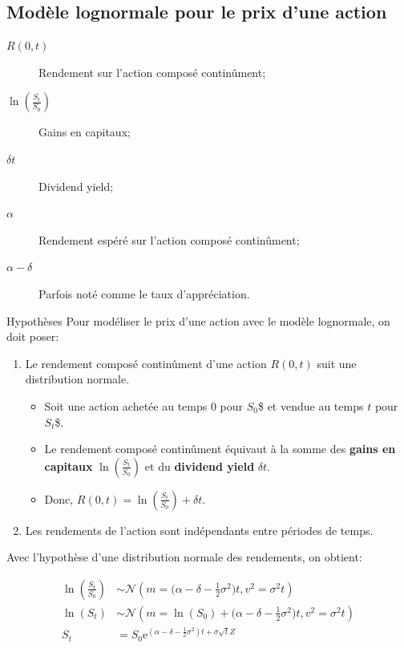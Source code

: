 \documentclass[10pt, french]{article}
\begin{document}
\begin{multicols*}{2}
\columnbreak

\subsection*{Modèle lognormale pour le prix d'une action}

\begin{distributions}[Notation]
\begin{description}
	\item[$R(0, t)$]	Rendement sur l'action composé continûment;
	\item[$\ln\left(\frac{S_{t}}{S_{0}}\right)$]	Gains en capitaux;
	\item[$\delta t$]	Dividend yield;
	\item[$\alpha$]	Rendement espéré sur l'action composé continûment;
	\item[$\alpha - \delta$]	Parfois noté comme le taux d'appréciation.
\end{description}
\end{distributions}

\begin{conceptgen}{Hypothèses}
Pour modéliser le prix d'une action avec le modèle lognormale, on doit poser:
\begin{enumerate}[leftmargin = *]
	\item	Le rendement composé continûment d'une action $R(0, t)$ suit une distribution normale.
			\begin{itemize}[leftmargin = *]
			\item	Soit une action achetée au temps $0$ pour $S_{0}$\$ et vendue au temps $t$ pour $S_{t}$\$.
			\item	Le rendement composé continûment équivaut à la somme des \textbf{gains en capitaux} $\ln\left(\frac{S_{t}}{S_{0}}\right)$ et du \textbf{dividend yield} $\delta t$.
			\item	Donc, $R(0, t) = \ln\left(\frac{S_{t}}{S_{0}}\right) + \delta t$.
			\end{itemize}
	\item	Les rendements de l'action sont indépendants entre périodes de temps.
\end{enumerate}
\end{conceptgen}

\begin{definitionNOHFILL}[Distribution]
Avec l'hypothèse d'une distribution normale des rendements, on obtient:

\begin{align*}
	\ln\left(\frac{S_{t}}{S_{0}}\right) 
	&\sim	\mathcal{N}\left(m = \Big(\alpha - \delta - \frac{1}{2}\sigma^{2}\Big)t, v^{2} = \sigma^{2}t\right)	\\
	\ln(S_{t}) 
	&\sim	\mathcal{N}\left(m = \ln(S_{0}) + \Big(\alpha - \delta - \frac{1}{2}\sigma^{2}\Big)t, v^{2} = \sigma^{2}t\right)	\\
	S_{t} 
	&=	S_{0}\textrm{e}^{(\alpha - \delta - \frac{1}{2}\sigma^{2})t + \sigma\sqrt{t}Z}
\end{align*}


\end{definitionNOHFILL}
\end{multicols*}
\end{document}
